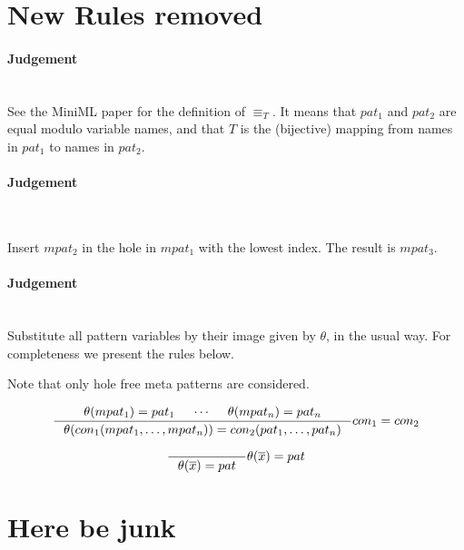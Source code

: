 \documentclass[a4, oneside]{article}
\begin{document}
\section{New Rules removed}

\paragraph{Judgement} \\

See the MiniML paper for the definition of $\equiv_T$. It means that $pat_1$ and
$pat_2$ are equal modulo variable names, and that $T$ is the (bijective) mapping
from names in $pat_1$ to names in $pat_2$.

\paragraph{Judgement} \\


Insert $mpat_2$ in the hole in $mpat_1$ with the lowest index. The result is
$mpat_3$.

\paragraph{Judgement} \\

Substitute all pattern variables by their image given by $\theta$, in the usual
way. For completeness we present the rules below.

Note that only hole free meta patterns are considered.

\[
\inference
{
  \theta(mpat_1) = pat_1 &
  \cdots &
  \theta(mpat_n) = pat_n
}
{
  \theta (con_1 (mpat_1, \ldots, mpat_n)) =
  con_2 (pat_1, \ldots, pat_n)
}
{
  con_1 = con_2
}
\]

\[
\inference
{
}
{
  \theta(\overline{x}) = pat
}
{
  \theta(\overline{x}) = pat
}
\]


\section{Here be junk}
\end{document}
